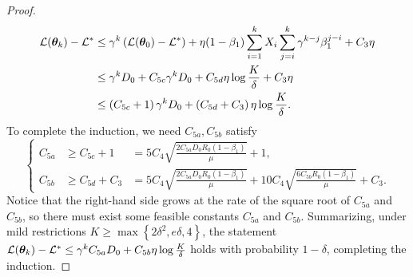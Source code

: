 \begin{proof}
\begin{align*}
     \mathcal{L}({\bm{\theta}}_{k})-\mathcal{L}^* & \leq \gamma^k \left(\mathcal{L}({\bm{\theta}}_0) - \mathcal{L}^*\right) + \eta (1-\beta_1)\sum_{i=1}^{k}X_i  \sum_{j=i}^{k}\gamma^{k-j}\beta_1^{j-i} + C_{3} \eta \\
     &\leq  \gamma^k D_0 + C_{5c}\gamma^k D_0 + C_{5d}\eta\log \frac{K}{\delta} + C_{3} \eta \\
     & \leq \left(C_{5c}+1\right)\gamma^k D_0 + \left(C_{5d}+C_3\right)\eta\log\frac{K}{\delta}.
\end{align*}
To complete the induction, we need $C_{5a}, C_{5b}$ satisfy
$$\left\{\begin{array}{lll}
    C_{5a} &\geq C_{5c}+1 &= 5C_4\sqrt{\frac{2C_{5a}D_0R_0(1-\beta_1)}{\mu}}+1,  \\
    C_{5b} &\geq C_{5d}+C_{3} &= 5C_4\sqrt{\frac{2C_{5a}D_0R_0(1-\beta_1)}{\mu}} + 10C_4\sqrt{\frac{6C_{5b}R_0(1-\beta_1)}{\mu}} + C_3. 
\end{array}\right.$$
Notice that the right-hand side grows at the rate of the square root of $C_{5a}$ and $C_{5b}$, so there must exist some feasible constants $C_{5a}$ and $C_{5b}$. Summarizing, under mild restrictions $K \geq \max\left\{2\delta^2, e\delta, 4\right\}$, the statement $\mathcal{L}({\bm{\theta}}_{k})-\mathcal{L}^* \leq \gamma
    ^k C_{5a}D_0 + C_{5b} \eta \log \frac{K}{\delta}$ holds with probability $1-\delta$, completing the induction.
\end{proof}


